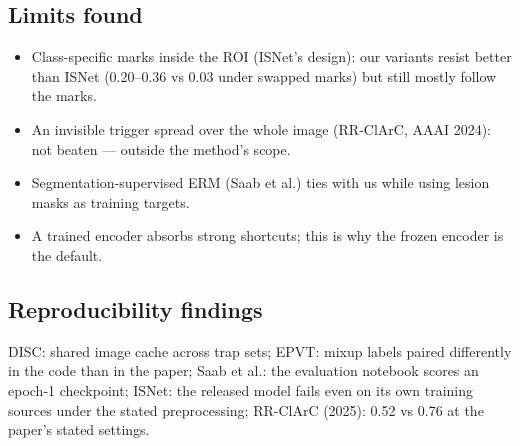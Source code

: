 \subsection{Limits found}
\begin{itemize}[leftmargin=*]
\item Class-specific marks inside the ROI (ISNet's design): our variants resist better than ISNet (0.20--0.36 vs 0.03
under swapped marks) but still mostly follow the marks.
\item An invisible trigger spread over the whole image (RR-ClArC, AAAI 2024): not beaten --- outside the method's scope.
\item Segmentation-supervised ERM (Saab et al.) ties with us while using lesion masks as training targets.
\item A trained encoder absorbs strong shortcuts; this is why the frozen encoder is the default.
\end{itemize}

\subsection{Reproducibility findings}
DISC: shared image cache across trap sets; EPVT: mixup labels paired differently in the code than in the paper; Saab et
al.: the evaluation notebook scores an epoch-1 checkpoint; ISNet: the released model fails even on its own training
sources under the stated preprocessing; RR-ClArC (2025): 0.52 vs 0.76 at the paper's stated settings.
